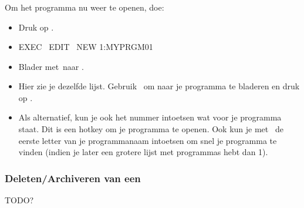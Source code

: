 \begin{frame}
\frametitle{ \tiPRGM}


Om het programma nu weer te openen, doe:
\begin{itemize}
  \item Druk op \tiPRGM.
  \pause %
  \item {}
	  \begin{ticalc}[3.25cm]
	  	EXEC \, EDIT \, NEW
	  	1:MYPRGM01
	  \end{ticalc}
  \pause %
  \item Blader met \tiRight\,naar .
  \pause %
  \item Hier zie je dezelfde lijst. Gebruik \tiDown\, om naar je programma te bladeren en druk op \tiENTER.
  \pause %
  \item Als alternatief, kun je ook het nummer intoetsen wat voor je programma staat. Dit is een hotkey om je programma te openen.
  \pause %
  		Ook kun je met \tiALPHA\, de eerste letter van je programmanaam intoetsen om snel je programma te vinden
  		(indien je later een grotere lijst met programmas hebt dan 1).
\end{itemize}
\end{frame}

\begin{frame}
\frametitle{Deleten/Archiveren van een \tiPRGM}
	TODO?
\end{frame}



